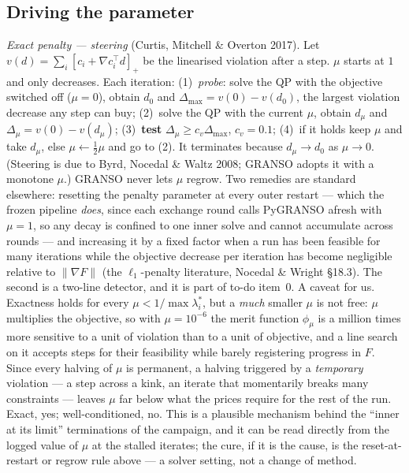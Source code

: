 \documentclass[11pt,a4paper]{article}
\newcommand{\T}{^{\!\top}}
\newcommand{\rev}[1]{#1}
\newcommand{\revb}[1]{#1}
\newcommand{\revc}[1]{#1}
\begin{document}
\subsection{Driving the parameter}
\label{sec:drive}
\emph{Exact penalty --- steering} (Curtis, Mitchell \& Overton 2017).  Let
$v(d)=\sum_i[c_i+\nabla c_i\T d]_+$ be the linearised violation after a step.  $\mu$
starts at $1$ and only decreases.  Each iteration: (1)~\emph{probe}: solve the QP with
the objective switched off ($\mu=0$), obtain $d_0$ and $\Delta_{\max}=v(0)-v(d_0)$, the
largest violation decrease any step can buy; (2)~solve the QP with the current $\mu$,
obtain $d_\mu$ and $\Delta_\mu=v(0)-v(d_\mu)$; (3)~\textbf{test}
$\Delta_\mu\ge c_v\Delta_{\max}$, $c_v=0.1$; (4)~if it holds keep $\mu$ and take $d_\mu$,
else $\mu\leftarrow\tfrac12\mu$ and go to (2).  It terminates because $d_\mu\to d_0$ as $\mu\to0$.  \revc{(Steering is due to Byrd, Nocedal \& Waltz 2008; GRANSO adopts it with a
monotone $\mu$.)  GRANSO never lets $\mu$ regrow.  Two remedies are standard elsewhere:
resetting the penalty parameter at every outer restart --- which the frozen pipeline
\emph{does}, since each exchange round calls PyGRANSO afresh with $\mu=1$, so any decay
is confined to one inner solve and cannot accumulate across rounds --- and increasing it
by a fixed factor when a run has been feasible for many iterations while the objective
decrease per iteration has become negligible relative to $\|\nabla F\|$ (the
$\ell_1$-penalty literature, Nocedal \& Wright \S18.3).  The second is a two-line
detector, and it is part of to-do item~0.}  \rev{A caveat for us.  Exactness holds for every $\mu<1/\max\lambda_i^\ast$, but a
\emph{much} smaller $\mu$ is not free: $\mu$ multiplies the objective, so with
$\mu=10^{-6}$ the merit function $\phi_\mu$ is a million times more sensitive to a
unit of violation than to a unit of objective, and a line search on it accepts steps for
their feasibility while barely registering progress in $F$.  Since every halving of
$\mu$ is permanent, a halving triggered by a \emph{temporary} violation --- a step
across a kink, an iterate that momentarily breaks many constraints --- leaves $\mu$ far
below what the prices require for the rest of the run.  Exact, yes; well-conditioned,
no.  This is a plausible mechanism behind the ``inner at its limit'' terminations of the
campaign, and it can be read directly from the logged value of $\mu$ at the stalled
iterates; \revb{the cure, if it is the cause, is the reset-at-restart or regrow rule
above --- a solver setting, not a change of method.}}
\end{document}
